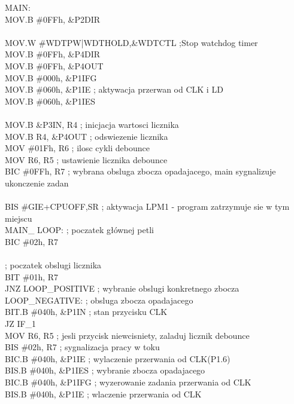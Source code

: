 \documentclass[a4paper,titlepage,11pt,floatssmall]{mwrep}
\begin{document}
MAIN:\\
	MOV.B \#0FFh, \&P2DIR\\
\\
	MOV.W   \#WDTPW|WDTHOLD,\&WDTCTL  ;Stop watchdog timer\\
    MOV.B   \#0FFh, \&P4DIR\\
    MOV.B   \#0FFh, \&P4OUT\\
    MOV.B   \#000h, \&P1IFG\\
    MOV.B   \#060h, \&P1IE    ; aktywacja przerwan od CLK i LD\\
    MOV.B	\#060h, \&P1IES\\
\\
	MOV.B \&P3IN, R4 		; inicjacja wartosci licznika\\
	MOV.B R4, \&P4OUT		; odswiezenie licznika\\
	MOV \#01Fh, R6 	        ; ilosc cykli debounce\\
	MOV R6, R5 	        	; ustawienie licznika debounce\\
	BIC \#0FFh, R7 	        ; wybrana obsluga zbocza opadajacego, main sygnalizuje ukonczenie zadan\\
\\
    BIS \#GIE+CPUOFF,SR 		; aktywacja LPM1 - program zatrzymuje sie w tym miejscu\\
MAIN\_ LOOP: 		        	; poczatek głównej petli\\
    BIC \#02h, R7\\
\\
	; poczatek obslugi licznika\\
    BIT \#01h, R7\\
	JNZ LOOP\_{}POSITIVE       ; wybranie obslugi konkretnego zbocza\\
LOOP\_{}NEGATIVE:	            ; obsluga zbocza opadajacego\\
	BIT.B \#040h, \&P1IN		; stan przycisku CLK\\
	JZ IF\_{}1\\
	MOV R6, R5 	        	; jesli przycisk niewcisniety, zaladuj licznik debounce\\
    BIS \#02h, R7            ; sygnalizacja pracy w toku\\
    BIC.B \#040h, \&P1IE      ; wylaczenie przerwania od CLK(P1.6)\\
    BIS.B \#040h, \&P1IES     ; wybranie zbocza opadajacego\\
    BIC.B \#040h, \&P1IFG     ; wyzerowanie zadania przerwania od CLK\\
    BIS.B \#040h, \&P1IE      ; wlaczenie przerwania od CLK\\
\end{document}
